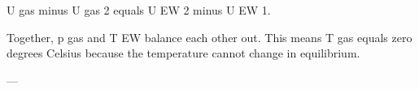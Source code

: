 U gas minus U gas 2 equals U EW 2 minus U EW 1.  

Together, p gas and T EW balance each other out. This means T gas equals zero degrees Celsius because the temperature cannot change in equilibrium.  

---